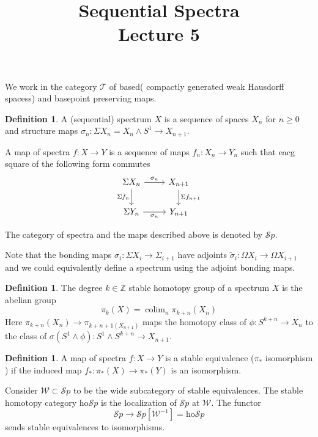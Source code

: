\documentclass[notitlepage,12pt]{article}
\makeatletter
\theoremstyle{definition}
\newtheorem{definition}[theorem]{Definition}
\theoremstyle{para}{\normalfont}
\newcommand*{\toccontents}{\@starttoc{toc}}
\DeclareMathOperator{\colim}{colim}
\makeatother
\begin{document}
\begin{titlepage}
    \title{Sequential Spectra\\
    Lecture 5
}
\author{  }
	\maketitle
	\thispagestyle{empty}
    	\toccontents
\end{titlepage}

We work in the category $\mathcal{T}$ of based( compactly generated weak Hausdorff spacess) and basepoint preserving maps. 
\begin{definition}
    A (sequential) spectrum $X$ is a sequence of spaces $X_n$ for $n\geq 0$ and structure maps $\sigma_n:\Sigma X_n=X_n\wedge S^1\to X_{n+1 }$. 
  
    A map of spectra $f:X\to Y$ is a sequence of maps $f_n:X_n\to Y_n$ such that eacg square of the following form commutes 
    \[
        \begin{tikzcd}
\Sigma X_n \arrow[r, "\sigma_n"] \arrow[d, "\Sigma f_n"'] & X_{n+1} \arrow[d, "\Sigma f_{n+1}"] \\
\Sigma Y_n \arrow[r, "\sigma_n"']                         & Y_{n+1}                            
\end{tikzcd}
    \]

    The category of spectra and the maps described above is denoted by $\mathcal{S}p$.
\end{definition}
Note that the bonding maps $\sigma_i:\Sigma X_i\to \Sigma_{i+1 }$ have adjoints $\tilde{\sigma}_i:\Omega X_i\to \Omega X_{i+1}$ and we could equivalently define a spectrum using the adjoint bonding maps. 

\begin{definition}
    The degree $k\in \mathbb{Z}$ stable homotopy group of a spectrum $X$ is the abelian group 
    \[
        \pi_k(X)=\colim_n \pi_{k+n}(X_n)
    \]Here $\pi_{k+n }(X_n)\to \pi_{k+n+1 (X_{n+1})}$ maps the homotopy class of $\phi:S^{k+n } \to X_n$ to the class of $\sigma(S^1\wedge \phi):S^1\wedge S^{k+n } \to X_{n+1 }$.
\end{definition}

\begin{definition}
    A map of spectra $f:X\to Y$ is a stable equivalence ($\pi_*$ isomorphism ) if the induced map $f_*:\pi_*(X)\to \pi_*(Y)$ is an isomorphism. 
\end{definition}

Consider $\mathcal{W}\subset \mathcal{S}p$ to be the wide subcategory of stable equivalences. The stable homotopy category $\mathrm{ho } \mathcal{S}p$ is the localization of $\mathcal{S}p$ at $\mathcal{W}$. The functor 
\[
    \mathcal{S}p\to \mathcal{S}p[\mathcal{W}^{-1 } ]=\mathrm{ho } \mathcal{S}p
\] sends stable equivalences to isomorphisms. 
\end{document}
